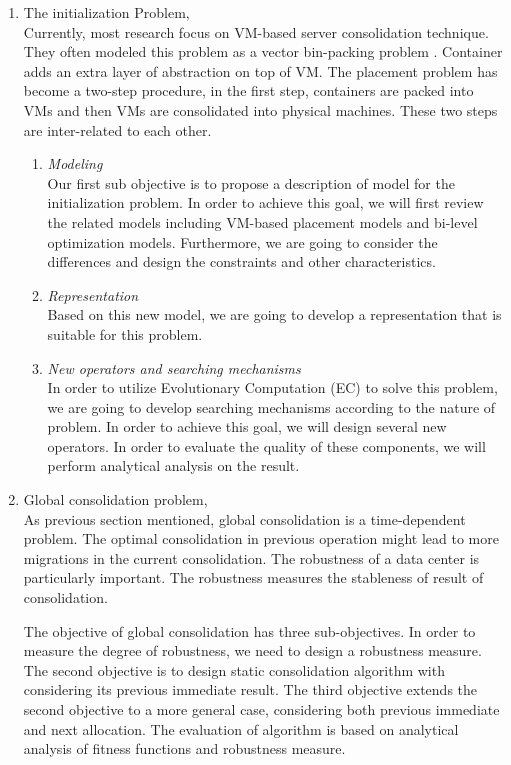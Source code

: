 \begin{enumerate}
	\item The initialization Problem, \\ 
	Currently, most research focus on VM-based server consolidation technique. They often modeled this problem as a vector bin-packing problem \cite{Zhang:2016cx}. Container adds an extra layer of abstraction on top of VM. The placement problem has become a two-step procedure, in the first step, containers are packed into VMs and then VMs are consolidated into physical machines. These two steps are inter-related to each other. 
	\begin{enumerate}
		\item \emph{Modeling} \\
		Our first sub objective is to propose a description of model for the initialization problem. In order to achieve this goal, we will first review the related models including VM-based placement models and bi-level optimization models. Furthermore, we are going to consider the differences and design the constraints and other characteristics.
		\item \emph{Representation} \\
		Based on this new model, we are going to develop a representation that is suitable for this problem.
		\item \emph{New operators and searching mechanisms}\\
		In order to utilize Evolutionary Computation (EC) to solve this problem, we are going to develop searching mechanisms according to the nature of problem. In order to achieve this goal, we will design several new operators. In order to evaluate the quality of these components, we will perform analytical analysis on the result.
	\end{enumerate}

	\item Global consolidation problem, \\
	As previous section mentioned, global consolidation is a time-dependent problem. The optimal consolidation in previous operation might lead to more migrations in the current consolidation. The robustness of a data center is particularly important. The robustness measures the stableness of result of consolidation.

	The objective of global consolidation has three sub-objectives.
	In order to measure the degree of robustness, we need to design a robustness measure. The second objective is to design static consolidation algorithm with considering its previous immediate result. The third objective extends the second objective to a more general case, considering both previous immediate and next allocation. The evaluation of algorithm is based on analytical analysis of fitness functions and robustness measure. 


\end{enumerate}

